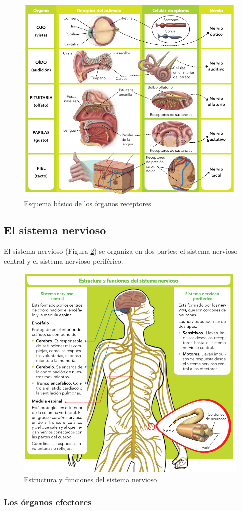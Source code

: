 \begin{figure}[!ht]
    \centering
    \includegraphics[width=0.6\linewidth]{Tema3/12_Organos_receptores.png}
    \caption{Esquema básico de los órganos receptores}
    \label{fig:organos-receptores}
\end{figure}

\subsection{El sistema nervioso}

El sistema nervioso (Figura \ref{fig:sistema-nervioso}) se organiza en dos partes: el sistema nervioso central y el sistema nervioso periférico.

\begin{figure}[!ht]
    \centering
    \includegraphics[width=0.6\linewidth]{Tema3/13_Estructura_funciones_sistema_nervioso.png}
    \caption{Estructura y funciones del sistema nervioso}
    \label{fig:sistema-nervioso}
\end{figure}

\subsubsection{Los órganos efectores}

